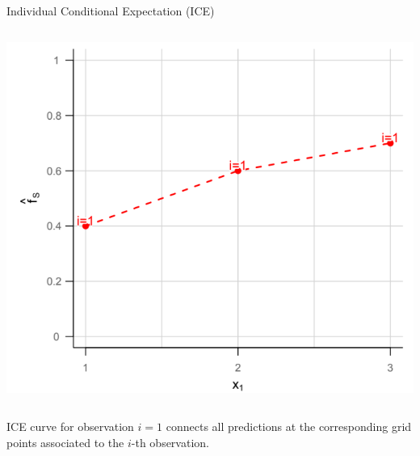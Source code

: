 \begin{vbframe}{Individual Conditional Expectation (ICE)}
\begin{onlyenv}
\begin{columns}[T]
\begin{column}{0.5\textwidth}
\begin{center}
\includegraphics[width=1\textwidth]{figure_man/ICE02.png}
\end{center}

\end{column}
\end{columns}
\end{onlyenv}

ICE curve for observation $i=1$ connects all predictions at the corresponding grid points associated to the $i$-th observation.


\end{vbframe}
